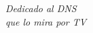 \documentclass[main]{subfiles}
\begin{document}
\chapter*{}
\begin{flushright}
\textit{
Dedicado al DNS \\
que lo mira por TV}
\end{flushright}
\end{document}
